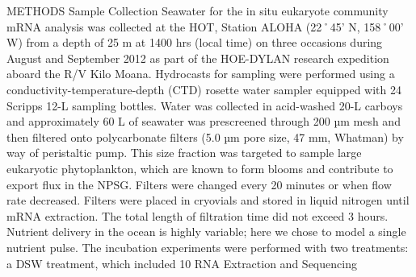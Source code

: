 METHODS
Sample Collection
Seawater for the in situ eukaryote community mRNA analysis was collected at the HOT, Station ALOHA (22˚45’ N, 158˚00’ W) from a depth of 25 m at 1400 hrs (local time) on three occasions during August and September 2012 as part of the HOE-DYLAN research expedition aboard the R/V Kilo Moana. Hydrocasts for sampling were performed using a conductivity-temperature-depth (CTD) rosette water sampler equipped with 24 Scripps 12-L sampling bottles. Water was collected in acid-washed 20-L carboys and approximately 60 L of seawater was prescreened through 200 µm mesh and then filtered onto polycarbonate filters (5.0 µm pore size, 47 mm, Whatman) by way of peristaltic pump. This size fraction was targeted to sample large eukaryotic phytoplankton, which are known to form blooms and contribute to export flux in the NPSG. Filters were changed every 20 minutes or when flow rate decreased. Filters were placed in cryovials and stored in liquid nitrogen until mRNA extraction. The total length of filtration time did not exceed 3 hours. Nutrient delivery in the ocean is highly variable; here we chose to model a single nutrient pulse. The incubation experiments were performed with two treatments: a DSW treatment, which included 10%
RNA Extraction and Sequencing
